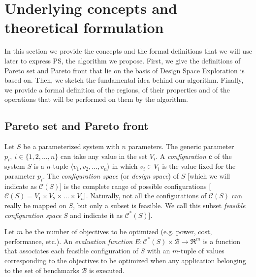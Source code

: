
\section{Underlying concepts and theoretical formulation}
\label{sec:statement_of_the_problem}

In this section we provide the concepts and the formal
definitions that we will use later to express PS, the algorithm we
propose.  First, we give the definitions of Pareto set and Pareto
front that lie on the basis of Design Space Exploration is based on.
Then, we sketch the fundamental idea behind our algorithm. Finally, we
provide a formal definition of the regions, of their properties and of
the operations that will be performed on them by the algorithm.


\subsection{Pareto set and Pareto front}

Let $S$ be a parameterized system with $n$ parameters. The generic
parameter $p_i, \ i \in \{1,2,\ldots,n\}$ can take any value in
the set $V_i$. A {\em configuration} $\mathbf{c}$ of the system
$S$ is a $n$-tuple $\langle v_1,v_2,\ldots,v_n \rangle$ in which
$v_i \in V_i$ is the value fixed for the parameter $p_i$. The {\em
configuration space} (or {\em design space}) of $S$ [which we will
indicate as $\mathcal{C}(S)$] is the complete range of possible
configurations [$\mathcal{C}(S) = V_1 \times V_2 \times \ldots
\times V_n$]. Naturally, not all the configurations of
$\mathcal{C}(S)$ can really be mapped on $S$, but only a subset 
is feasible. We call this subset {\em
feasible configuration space} $S$ and indicate it as
$\mathcal{C}^*(S)$].

Let $m$ be the number of objectives to be optimized (e.g. power,
cost, performance, etc.). An {\em evaluation function}
$E:\mathcal{C}^*(S)\times \mathcal{B} \longrightarrow \Re^m$ is a
function that associates each feasible configuration of $S$ with
an $m$-tuple of values corresponding to the objectives to be
optimized when any application belonging to the set of benchmarks
$\mathcal{B}$ is executed.

